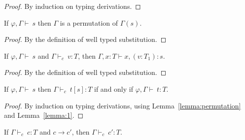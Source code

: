 \documentclass[preprint,authoryear,sort&compress,9pt,nocopyrightspace]{article}
\newcommand{\tto}{\longrightarrow}
\newcommand{\SubxD}{x,(v:T_1):s}
\newcommand{\env}{{\emt,\Gamma \vdash \ }}
\newcommand{\tyC}{{\Gamma \vdash_c \ }}
\newcommand{\emt}{\varphi}
\begin{document}
\begin{proof}By induction on typing derivations.
\end{proof}

\begin{lemma}
\label{lemma:1}
\mbox{}
If $\env s$ then $\Gamma$ is a permutation of $\Gamma(s)$.
\end{lemma}

\begin{proof}By the definition of well typed substitution.
\end{proof}
\begin{lemma}
\label{lemma:2}
\mbox{}
If $\env s$ and $\tyC v : T$, then $\Gamma,x:T \vdash \SubxD$.
\end{lemma}

\begin{proof} By the definition of well typed substitution.\end{proof}

\begin{lemma}
\label{lemma:3}
\mbox{}
If $\env s$ then $\tyC t[s] : T$ if and only if $\env t:T$.
\end{lemma}

\begin{proof}By induction on typing derivations, using Lemma~\ref{lemma:permutation} and Lemma~\ref{lemma:1}.
\end{proof}


\begin{theorem}[Preservation]
\label{theorem:preservation}
\mbox{}
If $\tyC c : T$ and $c \tto c'$, then $\tyC c	' : T$.
\end{theorem}
\end{document}
